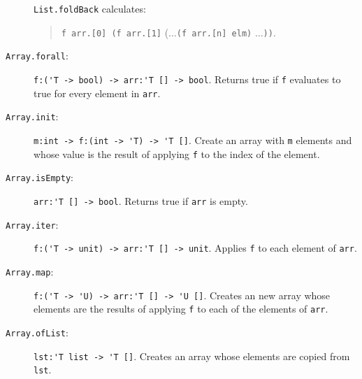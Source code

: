\documentclass[fsharpnotes.tex]{subfiles}
\begin{document}
\begin{description}
  \lstinline{List.foldBack} calculates:
  \begin{quote}
    \lstinline{f arr.[0] (f arr.[1]} ($\ldots$\lstinline{(f arr.[n] elm)} $\ldots$\lstinline{))}.
  \end{quote}
\item[\texttt{Array.forall}:] \lstinline{f:('T -> bool) -> arr:'T [] -> bool}. Returns true if \lstinline{f} evaluates to true for every element in \lstinline{arr}.
\item[\texttt{Array.init}:] \lstinline{m:int -> f:(int -> 'T) -> 'T []}. Create an array with \lstinline{m} elements and whose value is the result of applying \lstinline{f} to the index of the element.
\item[\texttt{Array.isEmpty}:] \lstinline{arr:'T [] -> bool}. Returns true if \lstinline{arr} is empty.
\item[\texttt{Array.iter}:] \lstinline{f:('T -> unit) -> arr:'T [] -> unit}. Applies \lstinline{f} to each element of \lstinline{arr}.
\item[\texttt{Array.map}:] \lstinline{f:('T -> 'U) -> arr:'T [] -> 'U []}. Creates an new array whose elements are the results of applying \lstinline{f} to each of the elements of \lstinline{arr}.
\item[\texttt{Array.ofList}:] \lstinline{lst:'T list -> 'T []}. Creates an array whose elements are copied from \lstinline{lst}.

\end{description}
\end{document}
